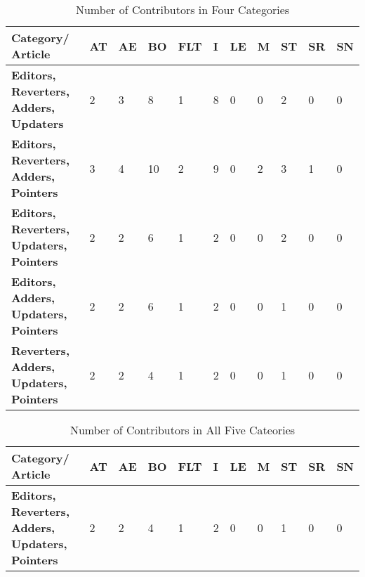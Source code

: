 \documentclass{llncs}
\begin{document}
\begin{table}[]
\centering
\begin{tabular}{T{6.4cm} T{0.6cm} T{0.6cm} T{0.6cm} T{0.6cm} T{0.6cm} T{0.6cm} T{0.6cm} T{0.6cm} T{0.6cm} T{0.6cm}}
{\bf Category/ Article} & {\bf AT} &  {\bf AE} &{\bf BO} & {\bf FLT} &  {\bf I} &  {\bf LE} &  {\bf M} &  {\bf ST} &  {\bf SR} &  {\bf SN} \\ \hline
{\bf Editors, Reverters, Adders, Updaters}           & 2   & 3   & 8   & 1   & 8   & 0   & 0   & 2   & 0   & 0   \\
{\bf Editors, Reverters, Adders, Pointers}           & 3   & 4   & 10  & 2   & 9   & 0   & 2   & 3   & 1   & 0  \\
{\bf Editors, Reverters, Updaters, Pointers}         & 2   & 2   & 6   & 1   & 2   & 0   & 0   & 2   & 0   & 0  \\ 
{\bf Editors, Adders, Updaters, Pointers}            & 2   & 2   & 6   & 1   & 2   & 0   & 0   & 1   & 0   & 0  \\ 
{\bf Reverters, Adders,  Updaters, Pointers}         & 2   & 2   & 4   & 1   & 2   & 0   & 0   & 1   & 0   & 0  

\end{tabular}
\caption{Number of Contributors in Four Categories}
\label{category_four}
\end{table}


\begin{table}[]
\centering
\begin{tabular}{T{7.7cm} T{0.6cm} T{0.6cm} T{0.6cm} T{0.6cm} T{0.6cm} T{0.6cm} T{0.6cm} T{0.6cm} T{0.6cm} T{0.6cm}}
{\bf Category/ Article} & {\bf AT} &  {\bf AE} &{\bf BO} & {\bf FLT} &  {\bf I} &  {\bf LE} &  {\bf M} &  {\bf ST} &  {\bf SR} &  {\bf SN} \\ \hline
{\bf Editors, Reverters, Adders, Updaters, Pointers} & 2   & 2   & 4   & 1   & 2   & 0   & 0   & 1   & 0   & 0 

\end{tabular}
\caption{Number of Contributors in All Five Cateories}
\label{category_five}
\end{table}
\end{document}
